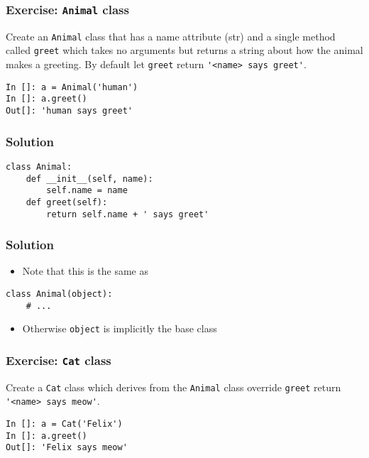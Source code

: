 \documentclass[14pt,compress,aspectratio=169]{beamer}
\begin{document}
\begin{frame}[fragile]
  \frametitle{Exercise: \lstinline{Animal} class}
  \begin{block}{}
    Create an \lstinline{Animal} class that has a name attribute (str) and a
    single method called \lstinline{greet} which takes no arguments but returns
    a string about how the animal makes a greeting.  By default let
    \lstinline{greet} return \lstinline{'<name> says greet'}.
  \end{block}
\begin{lstlisting}
In []: a = Animal('human')
In []: a.greet()
Out[]: 'human says greet'
\end{lstlisting}
\end{frame}

\begin{frame}
  \frametitle{Solution}
\begin{lstlisting}
class Animal:
    def __init__(self, name):
        self.name = name
    def greet(self):
        return self.name + ' says greet'
\end{lstlisting}
\end{frame}

\begin{frame}
  \frametitle{Solution}
  \begin{itemize}
  \item Note that this is the same as
  \end{itemize}
\begin{lstlisting}
class Animal(object):
    # ...
\end{lstlisting}
  \begin{itemize}
  \item Otherwise \lstinline{object} is implicitly the base class
  \end{itemize}

\end{frame}

\begin{frame}[fragile]
  \frametitle{Exercise: \lstinline{Cat} class}
  \begin{block}{}
    Create a \lstinline{Cat} class which derives from the \lstinline{Animal}
    class \alert{override} \lstinline{greet} return
    \lstinline{'<name> says meow'}.
  \end{block}
\begin{lstlisting}
In []: a = Cat('Felix')
In []: a.greet()
Out[]: 'Felix says meow'
\end{lstlisting}
\end{frame}
\end{document}

